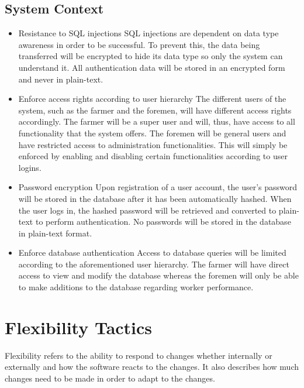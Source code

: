 \documentclass[11pt,fleqn]{book} %
\begin{document}
	\subsection{System Context}
	\begin{itemize}
		\item Resistance to SQL injections\newline\newline
		SQL injections are dependent on data type awareness in order to be successful. To prevent this, the data being transferred will be encrypted to hide its data type so only the system can understand it. All authentication data will be stored in an encrypted form and never in plain-text.\newline
		
		\item Enforce access rights according to user hierarchy \newline\newline
		The different users of the system, such as the farmer and the foremen, will have different access rights accordingly. The farmer will be a super user and will, thus, have access to all functionality that the system offers. The foremen will be general users and have restricted access to administration functionalities. This will simply be enforced by enabling and disabling certain functionalities according to user logins.\newline
		
		\item Password encryption\newline\newline
		Upon registration of a user account, the user’s password will be stored in the database after it has been automatically hashed. When the user logs in, the hashed password will be retrieved and converted to plain-text to perform authentication. No passwords will be stored in the database in plain-text format.\newline
		
		\item Enforce database authentication\newline\newline
		Access to database queries will be limited according to the aforementioned user hierarchy. The farmer will have direct access to view and modify the database whereas the foremen will only be able to make additions to the database regarding worker performance.			
	\end{itemize}
	\section{Flexibility Tactics}
	Flexibility refers to the ability to respond to changes whether internally or externally and how the software reacts to the changes. It also describes how much changes need to be made in order to adapt to the changes.
\end{document}
